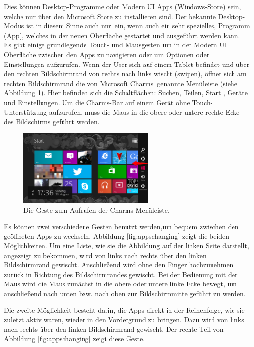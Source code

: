 \documentclass[12pt,a4paper,bibtotoc,abstracton]{scrartcl}
\begin{document}
Dies können Desktop-Programme oder Modern UI Apps (Windows-Store) sein, welche nur über den Microsoft Store zu installieren sind. Der bekannte Desktop-Modus ist in diesem Sinne auch \glqq nur\grqq\ ein, wenn auch ein sehr spezielles, Programm (App), welches in der neuen Oberfläche gestartet und ausgeführt werden kann.\\
Es gibt einige grundlegende Touch- und Mausgesten um in der Modern UI Oberfläche zwischen den Apps zu navigieren oder um Optionen oder Einstellungen aufzurufen. Wenn der User sich auf einem Tablet befindet und über den rechten Bildschirmrand von rechts nach links wischt (swipen), öffnet sich am rechten Bildschirmrand die von Microsoft \glqq Charms\grqq\ genannte Menüleiste (siehe Abbildung \ref{fig:charms}). Hier befinden sich die Schaltflächen: Suchen, Teilen, Start , Geräte und Einstellungen. Um die Charms-Bar auf einem Gerät ohne Touch-Unterstützung aufzurufen, muss die Maus in die obere oder untere rechte Ecke des Bildschirms geführt werden. 

\begin{figure}[h]	
	\centering
	\includegraphics[width=0.6\textwidth]{Bilder/Screenshots/windows8/charm_bar.png} 
	\caption{Die Geste zum Aufrufen der Charms-Menüleiste.}
	\label{fig:charms}
\end{figure}  

Es können zwei verschiedene Gesten benutzt werden,um bequem zwischen den geöffneten Apps zu wechseln. Abbildung \ref{fig:appschanging} zeigt die beiden Möglichkeiten. Um eine Liste, wie sie die Abbildung auf der linken Seite darstellt, angezeigt zu bekommen, wird von links nach rechts über den linken Bildschirmrand gewischt. Anschließend wird ohne den Finger hochzunehmen zurück in Richtung des Bildschirmrandes gewischt. Bei der Bedienung mit der Maus wird die Maus zunächst in die obere oder untere linke Ecke bewegt, um anschließend nach unten bzw. nach oben zur Bildschirmmitte geführt zu werden.

Die zweite Möglichkeit besteht darin, die Apps direkt in der Reihenfolge, wie sie zuletzt aktiv waren, wieder in den Vordergrund zu bringen. Dazu wird von links nach rechts über den linken Bildschirmrand gewischt. Der rechte Teil von Abbildung \ref{fig:appschanging} zeigt diese Geste.
 
\end{document}
